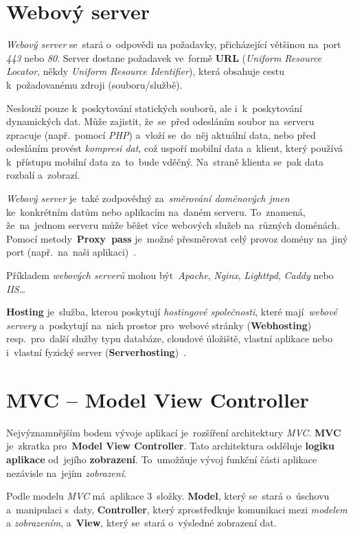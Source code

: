 \documentclass[11pt,a4paper]{report}
\begin{document}
        \section{Webový server}
            \emph{Webový server} se~stará o~odpovědi na požadavky, přicházející většinou na~port \emph{443} nebo \emph{80}. Server dostane požadavek ve~formě \textbf{URL} (\emph{Uniform Resource Locator}, někdy \emph{Uniform Resource Identifier}), která obsahuje cestu k~požadovanému zdroji (souboru/službě).

            Neslouží pouze k~poskytování statických souborů, ale i~k~poskytování dynamických dat. Může zajistit, že~se~před odesláním soubor na~serveru zpracuje (např.~pomocí \emph{PHP}) a~vloží se~do~něj aktuální data, nebo před odesláním provést \emph{kompresi dat}, což uspoří mobilní data a~klient, který používá k~přístupu mobilní data za~to~bude vděčný. Na~straně klienta se~pak data rozbalí a~zobrazí.

            \emph{Webový server} je~také zodpovědný za~\emph{směrování doménových jmen} ke~konkrétním datům nebo aplikacím na~daném serveru. To~znamená, že~na~jednom serveru může běžet více webových služeb na~různých doménách. Pomocí metody~\textbf{Proxy~pass} je~možné přesměrovat celý provoz domény na~jiný port (např.~na~naši aplikaci)~\cite{webserver:mdn}.

            Příkladem \emph{webových serverů} mohou být~\emph{Apache}, \emph{Nginx}, \emph{Lighttpd}, \emph{Caddy} nebo \emph{IIS}\dots

            \textbf{Hosting} je~služba, kterou poskytují \emph{hostingové společnosti}, které mají~\emph{webové servery} a~poskytují na~nich prostor pro~webové stránky (\textbf{Webhosting}) resp.~pro~další služby typu databáze, cloudové úložiště, vlastní aplikace nebo i~vlastní fyzický server (\textbf{Serverhosting})~\cite{dockernginxperformance}.
        
        \section{MVC -- Model View Controller}
        \label{MVC}
            Nejvýznamnějším bodem vývoje aplikací je~rozšíření architektury \emph{MVC}. \textbf{MVC} je~zkratka pro~\textbf{Model View Controller}. Tato architektura odděluje \textbf{logiku aplikace} od~jejího \textbf{zobrazení}. To~umožňuje vývoj funkční části aplikace nezávisle na~jejím \emph{zobrazení}.

            Podle modelu \emph{MVC} má~aplikace 3~složky. \textbf{Model}, který se~stará o~úschovu a~manipulaci s~daty, \textbf{Controller}, který zprostředkuje komunikaci mezi \emph{modelem} a \emph{zobrazením}, a~\textbf{View}, který se~stará o~výsledné zobrazení dat.
            
\end{document}
